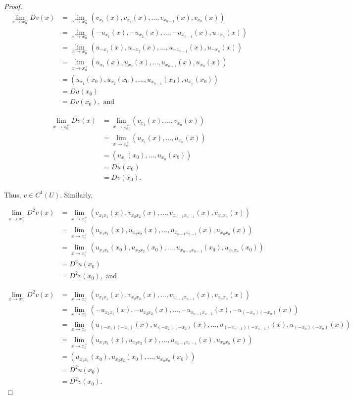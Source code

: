 \documentclass[11pt,oneside,english]{amsart}
\theoremstyle{definition}
\newcommand{\lom}[2]{\lim_{{#1}\rightarrow{#2}}}
\begin{document}
\begin{enumerate}
\begin{proof}
\begin{align*}
\lom{x}{x_0^-}Dv(x)&=\lom{x}{x_0^-}(v_{x_1}(x),v_{x_2}(x),\ldots,v_{x_{n-1}}(x),v_{x_n}(x))\\[2mm]
&=\lom{x}{x_0^-}(-u_{x_1}(x),-u_{x_2}(x),\ldots,-u_{x_{n-1}}(x),u_{-x_n}(x))\\[2mm]
&=\lom{x}{x_0^-}(u_{-x_1}(x),u_{-x_2}(x),\ldots,u_{-x_{n-1}}(x),u_{-x_n}(x))\\[2mm]
&=\lom{x}{x_0^+}(u_{x_1}(x),u_{x_2}(x),\ldots,u_{x_{n-1}}(x),u_{x_n}(x))\\[2mm]
&=(u_{x_1}(x_0),u_{x_2}(x_0),\ldots,u_{x_{n-1}}(x_0),u_{x_n}(x_0))\\[2mm]
&=Du(x_0)\\[2mm]
&=Dv(x_0),\text{ and}
\end{align*}

\begin{align*}
\lom{x}{x_0^+}Dv(x)&=\lom{x}{x_0^+}(v_{x_1}(x),\ldots,v_{x_n}(x))\\[2mm]
&=\lom{x}{x_0^+}(u_{x_1}(x),\ldots,u_{x_n}(x))\\[2mm]
&=(u_{x_1}(x_0),\ldots,u_{x_n}(x_0))\\[2mm]
&=Du(x_0)\\[2mm]
&=Dv(x_0).
\end{align*}

Thus, $v\in C^1(U)$. Similarly,

\begin{align*}
\lom{x}{x_0^+}D^2v(x)&=\lom{x}{x_0^+}(v_{x_1x_1}(x),v_{x_2x_2}(x),\ldots,v_{x_{n-1}x_{n-1}}(x),v_{x_nx_n}(x))\\[2mm]
&=\lom{x}{x_0^+}(u_{x_1x_1}(x),u_{x_2x_2}(x),\ldots,u_{x_{n-1}x_{n-1}}(x),u_{x_nx_n}(x))\\[2mm]
&=\lom{x}{x_0^+}(u_{x_1x_1}(x_0),u_{x_2x_2}(x_0),\ldots,u_{x_{n-1}x_{n-1}}(x_0),u_{x_nx_n}(x_0))\\[2mm]
&=D^2u(x_0)\\[2mm]
&=D^2v(x_0),\text{ and}
\end{align*}

\begin{align*}
\lom{x}{x_0^-}D^2v(x)&=\lom{x}{x_0^-}(v_{x_1x_1}(x),v_{x_2x_2}(x),\ldots,v_{x_{n-1}x_{n-1}}(x),v_{x_nx_n}(x))\\[2mm]
&=\lom{x}{x_0^-}(-u_{x_1x_1}(x),-u_{x_2x_2}(x),\ldots,-u_{x_{n-1}x_{n-1}}(x),-u_{(-x_n)(-x_n)}(x))\\[2mm]
&=\lom{x}{x_0^-}(u_{(-x_1)(-x_1)}(x),u_{(-x_2)(-x_2)}(x),\ldots,u_{(-x_{n-1})(-x_{n-1})}(x),u_{(-x_n)(-x_n)}(x))\\[2mm]
&=\lom{x}{x_0^+}(u_{x_1x_1}(x),u_{x_2x_2}(x),\ldots,u_{x_{n-1}x_{n-1}}(x),u_{x_nx_n}(x))\\[2mm]
&=(u_{x_1x_1}(x_0),u_{x_2x_2}(x_0),\ldots, u_{x_nx_n}(x_0))\\[2mm]
&=D^2u(x_0)\\[2mm]
&=D^2v(x_0).
\end{align*}



\end{proof}
\end{enumerate}
\end{document}
